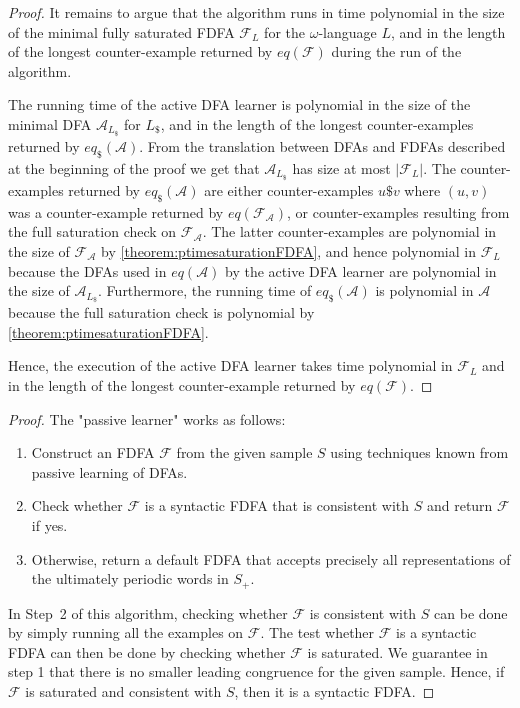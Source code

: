 \documentclass[a4paper,USenglish,cleveref,autoref,thm-restate]{lipics-v2021}
\newcommand{\mc}[1]{\ensuremath{\mathcal{#1}}}
\newcommand{\A}{\mc{A}}
\newcommand{\F}{\mc{F}}
\newcommand{\eoracle}{\textit{eq}}
\begin{document}
{\begin{proof}
    It remains to argue that the algorithm runs in time polynomial in the size of the minimal fully saturated FDFA $\F_L$ for the $\omega$-language $L$, and in the length of the longest counter-example returned by $\eoracle(\F)$ during the run of the algorithm.

  The running time of the active DFA learner is polynomial in the size of the minimal DFA $\A_{L_\$}$ for $L_\$$, and in the length of the longest counter-examples returned by $\eoracle_\$(\A)$.
  From the translation between DFAs and FDFAs described at the beginning of the proof we get that $\A_{L_\$}$ has size at most $|\F_L|$. The counter-examples returned by $\eoracle_\$(\A)$ are either counter-examples $u\$v$ where $(u,v)$ was a counter-example returned by $\eoracle(\F_\A)$, or counter-examples resulting from the full saturation check on $\F_\A$. The latter counter-examples are polynomial in the size of $\F_\A$ by \cref{theorem:ptimesaturationFDFA}, and hence polynomial in $\F_L$ because the DFAs used in $\eoracle(\A)$ by the active DFA learner are polynomial in the size of $\A_{L_\$}$. Furthermore, the running time of $\eoracle_\$(\A)$ is polynomial in $\A$ because the full saturation check is polynomial by \cref{theorem:ptimesaturationFDFA}.

  Hence, the execution of the active DFA learner takes time polynomial in $\F_L$ and in the length of the longest counter-example returned by $\eoracle(\F)$.
\end{proof}


\passivelearner*
\begin{proof}
  The "passive learner" works as follows:
  \begin{enumerate}\item Construct an FDFA $\F$ from the given sample $S$ using techniques known from passive learning of DFAs.
  \item  Check whether $\F$ is a syntactic FDFA that is consistent with $S$ and return $\F$ if yes. 
  \item Otherwise, return a default FDFA that accepts precisely all representations of the ultimately periodic words in $S_+$.
  \end{enumerate}
  In Step~2 of this algorithm, checking whether $\F$ is consistent with $S$ can be done by simply running all the examples on $\F$. The test whether $\F$ is a syntactic FDFA can then be done by checking whether $\F$ is saturated. We guarantee in step 1 that there is no smaller leading congruence for the given sample.  Hence, if $\F$ is saturated and consistent with $S$, then it is a syntactic FDFA.


\end{proof}}
\end{document}
